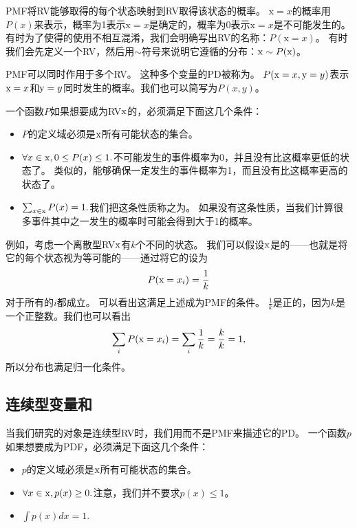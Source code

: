 
\gls{PMF}将\gls{RV}能够取得的每个状态映射到\gls{RV}取得该状态的概率。
$\mathrm{x} = x$的概率用$P(x)$来表示，概率为1表示$\mathrm{x} = x$是确定的，概率为0表示$\mathrm{x}=x$是不可能发生的。
有时为了使得的使用不相互混淆，我们会明确写出\gls{RV}的名称：$P(\mathrm{x} = x)$。
有时我们会先定义一个\gls{RV}，然后用$\sim$符号来说明它遵循的分布：$\mathrm{x}\sim P(\mathrm{x})$。

\gls{PMF}可以同时作用于多个\gls{RV}。
这种多个变量的\gls{PD}被称为。
$P(\mathrm{x} = x, \mathrm{y} = y)$表示$\mathrm{x} = x$和$\mathrm{y} = y$同时发生的概率。我们也可以简写为$P(x, y)$。

一个函数$P$如果想要成为\gls{RV}$\mathrm{x}$的，必须满足下面这几个条件：
\begin{itemize}
\item $P$的定义域必须是$\mathrm{x}$所有可能状态的集合。

\item $\forall x \in \mathrm{x}, 0\le P(x)\le 1.$不可能发生的事件概率为0，并且没有比这概率更低的状态了。
类似的，能够确保一定发生的事件概率为1，而且没有比这概率更高的状态了。

\item $\sum_{x \in \mathrm{x}} P(x) = 1.$我们把这条性质称之为。
如果没有这条性质，当我们计算很多事件其中之一发生的概率时可能会得到大于1的概率。
\end{itemize}

例如，考虑一个离散型\gls{RV}$\mathrm{x}$有$k$个不同的状态。
我们可以假设$\mathrm{x}$是的——也就是将它的每个状态视为等可能的——通过将它的设为
\begin{equation}
P(\mathrm{x} = x_i) = \frac{1}{k}
\end{equation}
对于所有的$i$都成立。
可以看出这满足上述成为\gls{PMF}的条件。
$\frac{1}{k}$是正的，因为$k$是一个正整数。我们也可以看出
\begin{equation}
\sum_i P(\mathrm{x} = x_i) = \sum_i \frac{1}{k} = \frac{k}{k} = 1,
\end{equation}
所以分布也满足归一化条件。


\subsection{连续型变量和}
\label{sec:continuous_variables_and_probability_density_functions}

当我们研究的对象是连续型\gls{RV}时，我们用而不是\gls{PMF}来描述它的\gls{PD}。
一个函数$p$如果想要成为\gls{PDF}，必须满足下面这几个条件：
\begin{itemize}
\item $p$的定义域必须是$\mathrm{x}$所有可能状态的集合。

\item $\forall x \in \mathrm{x}, p(x)\ge 0.$注意，我们并不要求$p(x)\le 1$。

\item $\int p(x) dx = 1.$
\end{itemize}

